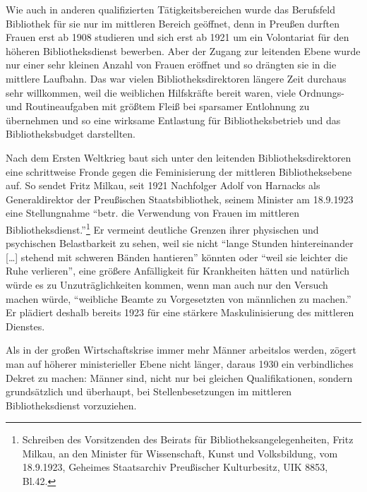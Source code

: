 \documentclass[a4paper,
fontsize=11pt,
oneside,
numbers=noperiodatend,
parskip=half-,
bibliography=totoc,
final
]{scrartcl}
\begin{document}
Wie auch in anderen qualifizierten Tätigkeitsbereichen wurde das
Berufsfeld Bibliothek für sie nur im mittleren Bereich geöffnet, denn in
Preußen durften Frauen erst ab 1908 studieren und sich erst ab 1921 um
ein Volontariat für den höheren Bibliotheksdienst bewerben. Aber der
Zugang zur leitenden Ebene wurde nur einer sehr kleinen Anzahl von
Frauen eröffnet und so drängten sie in die mittlere Laufbahn. Das war
vielen Bibliotheksdirektoren längere Zeit durchaus sehr willkommen, weil
die weiblichen Hilfskräfte bereit waren, viele Ordnungs- und
Routineaufgaben mit größtem Fleiß bei sparsamer Entlohnung zu übernehmen
und so eine wirksame Entlastung für Bibliotheksbetrieb und das
Bibliotheksbudget darstellten.

Nach dem Ersten Weltkrieg baut sich unter den leitenden
Bibliotheksdirektoren eine schrittweise Fronde gegen die Feminisierung
der mittleren Bibliotheksebene auf. So sendet Fritz Milkau, seit 1921
Nachfolger Adolf von Harnacks als Generaldirektor der Preußischen
Staatsbibliothek, seinem Minister am 18.9.1923 eine Stellungnahme
\enquote{betr. die Verwendung von Frauen im mittleren
Bibliotheksdienst.}\footnote{Schreiben des Vorsitzenden des Beirats für
  Bibliotheksangelegenheiten, Fritz Milkau, an den Minister für
  Wissenschaft, Kunst und Volksbildung, vom 18.9.1923, Geheimes
  Staatsarchiv Preußischer Kulturbesitz, UIK 8853, Bl.42.} Er vermeint
deutliche Grenzen ihrer physischen und psychischen Belastbarkeit zu
sehen, weil sie nicht \enquote{lange Stunden hintereinander
{[}\ldots{}{]} stehend mit schweren Bänden hantieren} könnten oder
\enquote{weil sie leichter die Ruhe verlieren}, eine größere
Anfälligkeit für Krankheiten hätten und natürlich würde es zu
Unzuträglichkeiten kommen, wenn man auch nur den Versuch machen würde,
\enquote{weibliche Beamte zu Vorgesetzten von männlichen zu machen.} Er
plädiert deshalb bereits 1923 für eine stärkere Maskulinisierung des
mittleren Dienstes.

Als in der großen Wirtschaftskrise immer mehr Männer arbeitslos werden,
zögert man auf höherer ministerieller Ebene nicht länger, daraus 1930
ein verbindliches Dekret zu machen: Männer sind, nicht nur bei gleichen
Qualifikationen, sondern grundsätzlich und überhaupt, bei
Stellenbesetzungen im mittleren Bibliotheksdienst vorzuziehen.
\end{document}
